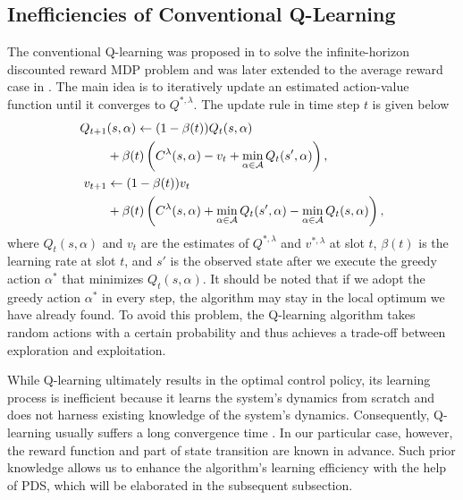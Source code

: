 \documentclass[lettersize, journal]{IEEEtran}
\begin{document}
\subsection{Inefficiencies of Conventional Q-Learning} \label{subsection:q_learning}
The conventional Q-learning was proposed in \cite{watkins1992q} to solve the infinite-horizon discounted reward MDP problem
and was later extended to the average reward case in \cite{schwartz1993reinforcement}.
The main idea is to iteratively update an estimated action-value function until it converges to $Q^{*, \lambda}$.
The update rule in time step $t$ is given below
\begin{align}
    Q_{t+1}&(s, \alpha) \gets (1-\beta(t)) Q_t(s, \alpha) \notag \\
    &+ \beta(t) \left( C^{\lambda}(s, \alpha) - v_t + \min_{\alpha\in\mathcal{A}} Q_t(s', \alpha) \right), \label{eq:update_Q} \\
    v_{t+1} &\gets (1 - \beta(t)) v_t \notag \\
    &+ \beta(t) \left( C^{\lambda}(s, \alpha) + \min_{\alpha\in\mathcal{A}} Q_t(s', \alpha) - \min_{\alpha\in\mathcal{A}} Q_t(s, \alpha) \right), \label{eq:update_v}
\end{align}
where $Q_t(s, \alpha)$ and $v_t$ are the estimates of $Q^{*, \lambda}$ and $v^{*, \lambda}$ at slot $t$,
$\beta(t)$ is the learning rate at slot $t$,
and $s'$ is the observed state after we execute the greedy action $\alpha^*$ that minimizes $Q_t(s, \alpha)$.
It should be noted that if we adopt the greedy action $\alpha^*$ in every step,
the algorithm may stay in the local optimum we have already found.
To avoid this problem, the Q-learning algorithm takes random actions with a certain probability
and thus achieves a trade-off between exploration and exploitation.

While Q-learning ultimately results in the optimal control policy, its learning process is inefficient because
it learns the system's dynamics from scratch and does not harness existing knowledge of the system's dynamics.
Consequently, Q-learning usually suffers a long convergence time \cite{jaksch2010near, even2004learning}.
In our particular case, however, the reward function and part of state transition are known in advance.
Such prior knowledge allows us to enhance the algorithm's learning efficiency
with the help of PDS, which will be elaborated in the subsequent subsection.
\end{document}
